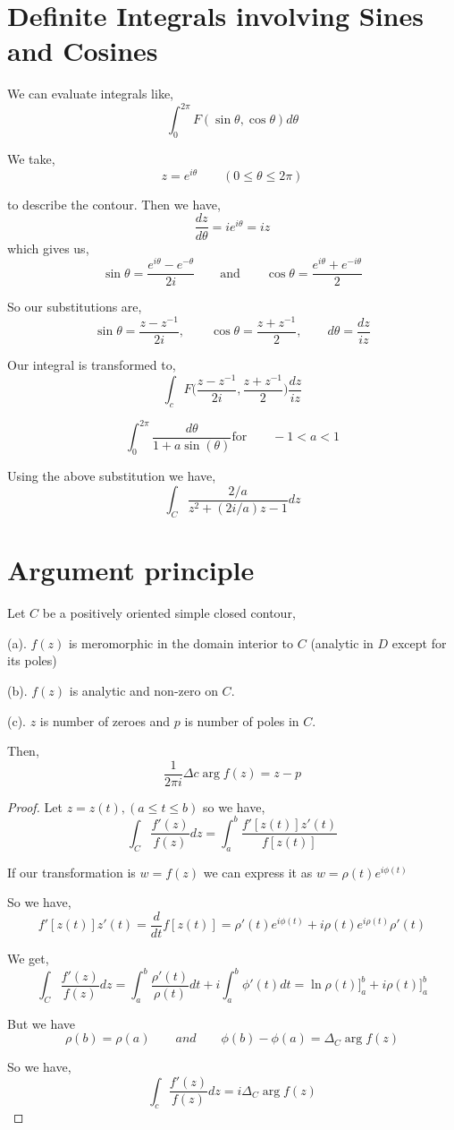 \section{Definite Integrals involving Sines and Cosines}
We can evaluate integrals like, 
$$ \int_0^{2\pi} F(\sin \theta, \cos \theta) d\theta $$ 

We take, 
$$ z = e^{i\theta} \qquad (0 \le \theta \le 2\pi) $$ 

to describe the contour. Then we have, 
$$ \frac{dz}{d\theta} = ie^{i\theta} = iz $$  which gives us, 
$$ \sin \theta = \frac{e^{i\theta} - e^{-\theta}}{2i} \qquad \text{and} \qquad \cos \theta = \frac{e^{i\theta} + e^{-i\theta}}{2} $$ 

So our substitutions are, 
$$ \sin \theta = \frac{z - z^{-1}}{2i}, \qquad \cos \theta = \frac{z + z^{-1}}{2}, \qquad d\theta = \frac{dz}{iz} $$ 

Our integral is transformed to, 
$$ \int_c F\bigg (\frac{z - z^{-1}}{2i} , \frac{z + z^{-1}}{2}\bigg ) \frac{dz}{iz} $$ 


\begin{eg}
   
   $$ \int_0^{2\pi} \frac{d\theta}{1 + a \sin(\theta)} \text{for} \qquad -1 < a < 1 $$ 

   Using the above substitution we have, 
   $$ \int_C \frac{2 / a}{z^2 + (2i / a)z - 1} dz$$ 
\end{eg}

\section{Argument principle}
\begin{theorem}
   Let $C$ be a positively oriented simple closed contour, 

   (a). $f(z)$ is meromorphic in the domain interior to $C$ (analytic in $D$ except for its poles)

   (b). $f(z)$ is analytic and non-zero on $C$.

   (c).  $z$ is number of zeroes and $p$ is number of poles in $C$. 


   Then, $$\frac{1}{2\pi i} \Delta c \arg f(z) = z - p$$
\end{theorem}
\begin{proof}
   Let $z = z(t), (a \le t \le b)$ so we have, 
   $$ \int_C \frac{f'(z)}{f(z)}dz = \int_a^{b} \frac{f'[z(t)] z'(t)}{f[z(t)]} $$ 

   If our transformation is $w = f(z)$ we can express it as $w = \rho(t) e^{i\phi(t)}$ 

   So we have, 
   $$ f'[z(t)]z'(t) = \frac{d}{dt}f[z(t)]= \rho'(t) e^{i\phi(t)} + i \rho(t)e^{i\rho (t)}\rho'(t) $$ 

   We get, 
$$ \int_C \frac{f'(z)}{f(z)}dz = \int_a^{b} \frac{\rho'(t)}{\rho(t)} dt + i \int_a^{b} \phi'(t)dt = \ln \rho(t) \bigg ]_a^{b} + i\rho(t) \bigg ]_a^{b} $$ 

But we have $$\rho(b) = \rho(a) \qquad and \qquad \phi(b) - \phi(a) = \Delta_C \arg f(z)$$

So we have, 
$$ \int_c \frac{f'(z)}{f(z)}dz =  i \Delta_C \arg f(z)$$ 

\end{proof}

